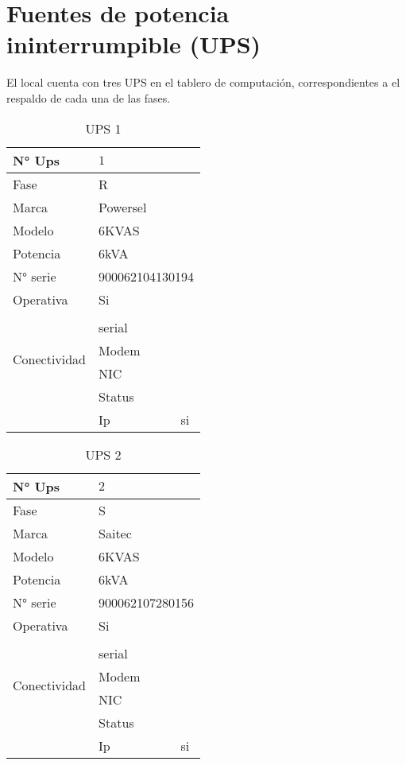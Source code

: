 \documentclass{article}
\begin{document}
\section{Fuentes de potencia ininterrumpible (UPS)}

El local cuenta con tres UPS en el tablero de computación, correspondientes a el respaldo de cada una de las fases.

\begin{center}
    \begin{table}[H]
        \centering
        \begin{tabular}{l l c}
            N° Ups & $1$ \\\hline
            Fase & \multicolumn{2}{l}{R} \\
            Marca & \multicolumn{2}{l}{Powersel} \\
            Modelo & \multicolumn{2}{l}{6KVAS} \\
            Potencia & \multicolumn{2}{l}{6kVA}\\
            N° serie & \multicolumn{2}{l}{900062104130194} \\
            Operativa & \multicolumn{2}{l}{Si} \\
            \multirow{5}{2cm}{Conectividad} & \\ & serial & \\
            & Modem & \\
            & NIC & \\
            & Status & \\
            & Ip & si\\
        \end{tabular}
        \caption{UPS 1}
        \label{tab:UPS1}
    \end{table}
\end{center}

\begin{center}
    \begin{table}[H]
        \centering
        \begin{tabular}{l l c}
            N° Ups & $2$ \\\hline
            Fase & \multicolumn{2}{l}{S} \\
            Marca & \multicolumn{2}{l}{Saitec} \\
            Modelo & \multicolumn{2}{l}{6KVAS} \\
            Potencia & \multicolumn{2}{l}{6kVA}\\
            N° serie & \multicolumn{2}{l}{900062107280156} \\
            Operativa & \multicolumn{2}{l}{Si} \\
            \multirow{5}{2cm}{Conectividad} & \\ & serial & \\
            & Modem & \\
            & NIC & \\
            & Status & \\
            & Ip & si\\
        \end{tabular}
        \caption{UPS 2}
        \label{tab:UPS2}
    \end{table}
\end{center}
\end{document}
